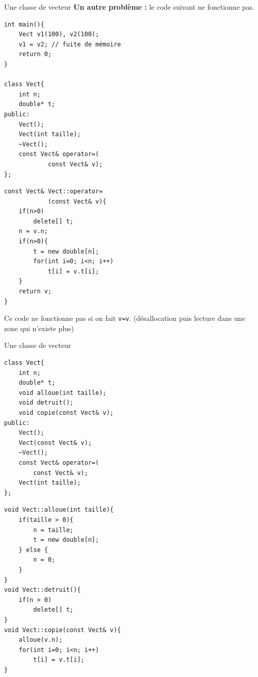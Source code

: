 \begin{frame}[fragile=singleslide]{Une classe de vecteur}
    \textbf{Un autre problème :} le code suivant ne fonctionne pas.

\begin{minipage}{0.44\linewidth}    
        \begin{verbatim}
int main(){
    Vect v1(100), v2(100);
    v1 = v2; // fuite de mémoire
    return 0;
}

class Vect{
    int n;
    double* t;
public:
    Vect();
    Vect(int taille);
    ~Vect();
    const Vect& operator=(
            const Vect& v);
};
            \end{verbatim}
        
    \end{minipage}
    \hfill
    \begin{minipage}{0.50\linewidth}
            \begin{verbatim}
const Vect& Vect::operator=
            (const Vect& v){
    if(n>0)
        delete[] t;
    n = v.n;
    if(n>0){
        t = new double[n];
        for(int i=0; i<n; i++)
            t[i] = v.t[i];
    }
    return v;
}
            \end{verbatim}
    \end{minipage}

    Ce code ne fonctionne pas si on fait \texttt{v=v}. (désallocation puis lecture dans une zone qui n'existe plus)
\end{frame}

\begin{frame}[fragile=singleslide]{Une classe de vecteur}

    \begin{minipage}{0.44\linewidth}
        
            \begin{verbatim}
class Vect{
    int n;
    double* t;
    void alloue(int taille);
    void detruit();
    void copie(const Vect& v);
public:
    Vect();
    Vect(const Vect& v);
    ~Vect();
    const Vect& operator=(
        const Vect& v);
    Vect(int taille);
};
            \end{verbatim}
        
    \end{minipage}
    \hfill
    \begin{minipage}{0.50\linewidth}
        
            \begin{verbatim}
void Vect::alloue(int taille){
    if(taille > 0){
        n = taille;
        t = new double[n];
    } else {
        n = 0;
    }
}
void Vect::detruit(){
    if(n > 0)
        delete[] t;
}
void Vect::copie(const Vect& v){
    alloue(v.n);
    for(int i=0; i<n; i++)
        t[i] = v.t[i];
}
            \end{verbatim}
        
    \end{minipage}
\end{frame}

